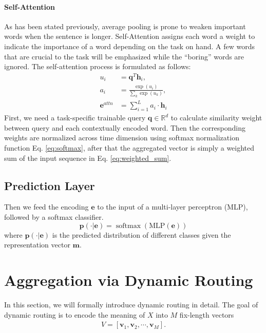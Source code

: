 \documentclass[11pt]{article}
\def\bv{\mathbf{v}}
\def\e{\mathbf{e}}
\def\p{\mathbf{p}}
\def\m{\mathbf{m}}
\DeclareMathOperator*{\softmax}{softmax}
\begin{document}
\paragraph{Self-Attention}
 As has been stated previously, average pooling is prone to weaken important words when the sentence is longer. Self-Attention assigns each word a weight to indicate the importance of a word depending on the task on hand. A few words that are crucial to the task will be emphasized while the ``boring'' words are ignored. The self-attention process is formulated as follows:
\begin{align}	
	u_i&=\mathbf{q}^T\mathbf{h}_i, \\
	a_i&=\frac{\exp(u_{i})}{\sum_k{\exp(u_{k})}}\label{eq:softmax}, \\
	\e^{attn}&=\sum_{i=1}^L {a_i \cdot \mathbf{h}_i}\label{eq:weighted_sum}
\end{align}
First, we need a task-specific trainable query $\mathbf{q} \in \mathbb{R}^{d}$ to calculate similarity weight between query and each contextually encoded word. Then the corresponding weights are normalized across time dimension using softmax normalization function Eq. \ref{eq:softmax}, after that the aggregated vector is simply a weighted sum of the input sequence in Eq. \ref{eq:weighted_sum}.





\subsection{Prediction Layer}

Then we feed the encoding $\e$ to the input of a multi-layer perceptron (MLP), followed by a softmax classifier.
 \begin{equation*}
	 \p(\cdot|\e) = \softmax(\mathrm{MLP}(\e))
 \end{equation*}
 where $\p(\cdot|\e)$ is the predicted distribution of different classes given the representation vector $\m$.

\section{Aggregation via Dynamic Routing}
\label{sec:dyrout}
In this section, we will formally introduce dynamic routing in detail.
The goal of dynamic routing is to encode the meaning of $X$ into $M$ fix-length vectors
\begin{align}
	V=[\bv_1,\bv_2,\cdots,\bv_M].
\end{align}
\end{document}
